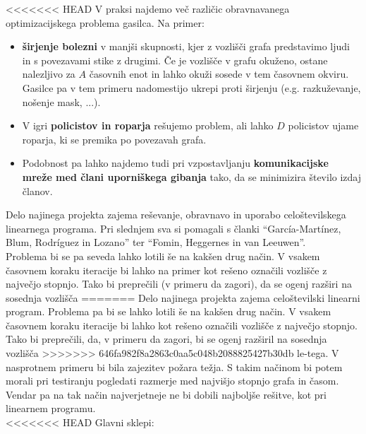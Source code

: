 \documentclass[a4paper, 12pt]{article}
\begin{document}
<<<<<<< HEAD
V praksi najdemo več različic obravnavanega optimizacijskega problema gasilca. Na primer:
\begin{itemize}
    \item\textbf{širjenje bolezni} v manjši skupnosti, kjer z vozlišči grafa predstavimo ljudi 
    in s povezavami stike z drugimi. Če je vozlišče v grafu okuženo, ostane nalezljivo 
    za $A$ časovnih enot in lahko okuži sosede v tem časovnem okviru. Gasilce pa v tem
    primeru nadomestijo ukrepi proti širjenju (e.g. razkuževanje, nošenje mask, ...).
    \item V igri \textbf{policistov in roparja} rešujemo problem, ali lahko $D$ policistov ujame roparja, ki se 
    premika po povezavah grafa. 
    \item Podobnost pa lahko najdemo tudi pri vzpostavljanju \textbf{komunikacijske mreže med člani uporniškega gibanja}
    tako, da se minimizira število izdaj članov.
\end{itemize}

\noindent Delo najinega projekta zajema reševanje, obravnavo in uporabo celoštevilskega linearnega programa. 
Pri slednjem sva si pomagali s članki ``García-Martínez, Blum, Rodríguez in Lozano''\cite{garcia2015} ter
``Fomin, Heggernes in van Leeuwen''\cite{fomin2015}. \\
Problema bi se pa seveda lahko lotili še
na kakšen drug način. V vsakem časovnem koraku iteracije bi lahko na primer kot rešeno označili vozlišče z 
največjo stopnjo. Tako bi preprečili (v primeru da zagori), da se ogenj razširi na sosednja vozlišča
=======
Delo najinega projekta zajema celoštevilski linearni program. Problema pa bi se lahko lotili še
na kakšen drug način. V vsakem časovnem koraku iteracije bi lahko kot rešeno označili vozlišče z 
največjo stopnjo. Tako bi preprečili, da, v primeru da zagori, bi se ogenj razširil na sosednja vozlišča
>>>>>>> 646fa982f8a2863c0aa5c048b2088825427b30db
le-tega. V nasprotnem primeru bi bila zajezitev požara težja. 
S takim načinom bi potem morali pri testiranju pogledati razmerje med najvišjo stopnjo 
grafa in časom. Vendar pa na tak način najverjetneje ne bi dobili najboljše
rešitve, kot pri linearnem programu. \\

<<<<<<< HEAD
\noindent Glavni sklepi: 

\pagebreak
\end{document}
